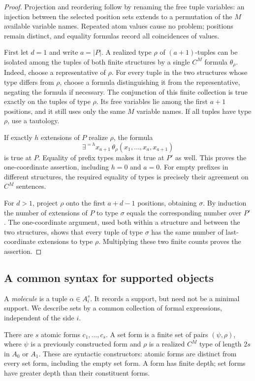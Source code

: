 \begin{proof}
Projection and reordering follow by renaming the free tuple variables:
an injection between the selected position sets extends to a permutation
of the $M$ available variable names.  Repeated atom values cause no
problem; positions remain distinct, and equality formulas record all
coincidences of values.

First let $d=1$ and write $a=|P|$.  A realized type $\rho$ of $(a+1)$-tuples
can be isolated among the tuples of both finite structures by a single
$C^M$ formula $\theta_\rho$.  Indeed, choose a representative of $\rho$.
For every tuple in the two structures whose type differs from $\rho$,
choose a formula distinguishing it from the representative, negating the
formula if necessary.  The conjunction of this finite collection is true
exactly on the tuples of type $\rho$.  Its free variables lie among the
first $a+1$ positions, and it still uses only the same $M$ variable names.
If all tuples have type $\rho$, use a tautology.

If exactly $h$ extensions of $P$ realize $\rho$, the formula
\[
 \exists^{=h}x_{a+1}\,
       \theta_\rho(x_1,\ldots,x_a,x_{a+1})
\]
is true at $P$.  Equality of prefix types makes it true at $P'$ as well.
This proves the one-coordinate assertion, including $h=0$ and $a=0$.
For empty prefixes in different structures, the required equality of
types is precisely their agreement on $C^M$ sentences.

For $d>1$, project $\rho$ onto the first $a+d-1$ positions, obtaining
$\sigma$.  By induction the number of extensions of $P$ to type $\sigma$
equals the corresponding number over $P'$.  The one-coordinate argument,
used both within a structure and between the two structures, shows that
every tuple of type $\sigma$ has the same number of last-coordinate
extensions to type $\rho$.  Multiplying these two finite counts proves
the assertion.
\end{proof}

\subsection{A common syntax for supported objects}

A \emph{molecule} is a tuple $\alpha\in A_i^s$.  It records a support, but
need not be a minimal support.  We describe sets by a common collection
of formal expressions, independent of the side $i$.

There are $s$ atomic forms $c_1,\ldots,c_s$.  A set form is a finite set
of pairs $(\psi,\rho)$, where $\psi$ is a previously constructed form
and $\rho$ is a realized $C^M$ type of length $2s$ in $A_0$ or $A_1$.
These are syntactic constructors: atomic forms are distinct from every
set form, including the empty set form.  A form has finite depth; set
forms have greater depth than their constituent forms.

